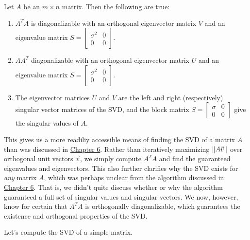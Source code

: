 \documentclass{ximera}
\begin{document}
\begin{theorem}\label{th:singvaldecomp}
Let $A$ be an $m\times n$ matrix. Then the following are true: 

\begin{enumerate}
\item $A^TA$ is diagonalizable with an orthogonal eigenvector matrix $V$ and an eigenvalue matrix $S=\begin{bmatrix}
    \sigma^2&0\\0&0\end{bmatrix}$. 
\item $AA^T$ diagonalizable with an orthogonal eigenvector matrix $U$ and an eigenvalue matrix $S=\begin{bmatrix}
    \sigma^2&0\\0&0\end{bmatrix}$. 
\item The eigenvector matrices $U$ and $V$ are the left and right (respectively) singular vector matrices of the SVD, and the block matrix $S=\begin{bmatrix}
    \sigma&0\\0&0\end{bmatrix}$ give the singular values of $A$.
\end{enumerate}

\end{theorem}

This gives us a more readiliy accessible means of finding the SVD of a matrix $A$ than was discussed in \href{https://ximera.osu.edu/appliedlinearalgebra/c6ChapterSix/learningActivities/m6LearningActivities/leastSquares/PCASVDIntro}{Chapter 6}. Rather than iteratively maximizing $\left\|A\vec{v}\right\|$ over orthogonal unit vectors $\vec{v}$, we simply compute $A^TA$ and find the guaranteed eigenvalues and eigenvectors. This also further clarifies why the SVD exists for \emph{any} matrix $A$, which was perhaps unclear from the algorithm discussed in \href{https://ximera.osu.edu/appliedlinearalgebra/c6ChapterSix/learningActivities/m6LearningActivities/leastSquares/PCASVDIntro}{Chapter 6}. That is, we didn't quite discuss whether or why the algorithm guaranteed a full set of singular values and singular vectors. We now, however, know for certain that $A^TA$ is orthogonally diagonalizable, which guarantees the existence and orthogonal properties of the SVD.
 
Let's compute the SVD of a simple matrix.
 
\end{document}
